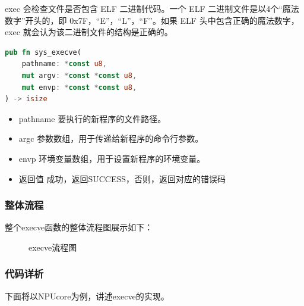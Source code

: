 exec 会检查文件是否包含 ELF 二进制代码。一个 ELF 二进制文件是以4个“魔法数字”开头的，即 0x7F，“E”，“L”，“F”。如果 ELF 头中包含正确的魔法数字， exec  就会认为该二进制文件的结构是正确的。
\begin{lstlisting}[language={Rust}, 
    caption={execve输入参数与返回值}]
pub fn sys_execve(
    pathname: *const u8,
    mut argv: *const *const u8,
    mut envp: *const *const u8,
) -> isize
\end{lstlisting}
\begin{itemize}
    \item pathname 要执行的新程序的文件路径。
    \item argc 参数数组，用于传递给新程序的命令行参数。
    \item envp 环境变量数组，用于设置新程序的环境变量。
    \item 返回值 成功，返回SUCCESS，否则，返回对应的错误码
\end{itemize}
\subsubsection{整体流程}
整个execve函数的整体流程图展示如下：
\begin{figure}[H]
    \centering
    \caption{execve流程图}
\end{figure}

\subsubsection{代码详析}
下面将以NPUcore为例，讲述execve的实现。


